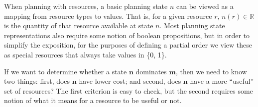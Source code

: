 \documentclass[letterpaper]{article}
\theoremstyle{plain} \newtheorem{theorem}{Theorem} \newtheorem{proposition}{Proposition} \newtheorem{lemma}{Lemma}
\theoremstyle{definition} \newtheorem{definition}{Definition} \newtheorem{conjecture}{Conjecture} \newtheorem*{example}{Example}
\theoremstyle{remark} \newtheorem*{remark}{Remark} \newtheorem*{note}{Note} \newtheorem{case}{Case}
\newcommand{\R}{\mathbb{R}}
\begin{document}
When planning with resources, a basic planning state $n$ can be viewed as a mapping from
resource types to values. That is, for a given resource $r$, $n(r) \in \R$ is the quantity
of that resource available at state $n$. Most planning state representations also
require some notion of boolean propositions, but in order to simplify the exposition, for the
purposes of defining a partial order we view these as special resources that always take
values in \{0, 1\}.

If we want to determine whether a state $\mathbf{n}$ dominates $\mathbf{m}$, then we need
to know two things: first, does $\mathbf{n}$ have lower cost; and second, does $\mathbf{n}$
have a more ``useful'' set of resources? The first criterion is easy to check, but the
second requires some notion of what it means for a resource to be useful or not.
\end{document}
